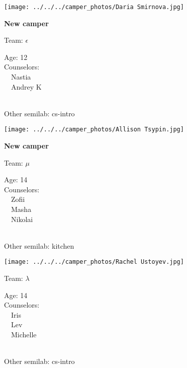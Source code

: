 \documentclass[10pt,letterpaper, landscape]{article}
\begin{document}
\horizontalshiftfornextsticker
\renewcommand{\baselinestretch}{1} \begin{sticker}
\noindent\begin{minipage}{0.5\textwidth}\texttt{[image: ../../../camper\_photos/Daria Smirnova.jpg]}\end{minipage}\begin{minipage}{0.45\textwidth}
\textbf{New camper} 

Team: {\Large $\epsilon$}

Age:        12\\
Counselors: \\\ \ Nastia\\\ \ Andrey K\\
\end{minipage} \\ \vspace{0.07in}
Other semilab: cs-intro
\end{sticker}
\horizontalshiftfornextsticker
\renewcommand{\baselinestretch}{1} \begin{sticker}
\noindent\begin{minipage}{0.5\textwidth}\texttt{[image: ../../../camper\_photos/Allison Tsypin.jpg]}\end{minipage}\begin{minipage}{0.45\textwidth}
\textbf{New camper} 

Team: {\Large $\mu$}

Age:        14\\
Counselors: \\\ \ Zofii\\\ \ Masha\\\ \ Nikolai\\
\end{minipage} \\ \vspace{0.07in}
Other semilab: kitchen
\end{sticker}
\horizontalshiftfornextsticker
\renewcommand{\baselinestretch}{1} \begin{sticker}
\noindent\begin{minipage}{0.5\textwidth}\texttt{[image: ../../../camper\_photos/Rachel Ustoyev.jpg]}\end{minipage}\begin{minipage}{0.45\textwidth}
Team: {\Large $\lambda$}

Age:        14\\
Counselors: \\\ \ Iris\\\ \ Lev\\\ \ Michelle\\
\end{minipage} \\ \vspace{0.07in}
Other semilab: cs-intro
\end{sticker}
\end{document}
